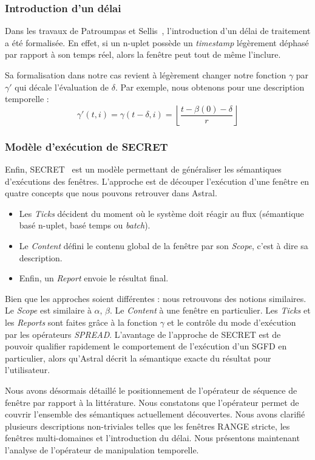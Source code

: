 \subsubsection{Introduction d'un délai}
Dans les travaux de Patroumpas et Sellis~\cite{Patroumpas:window}, l'introduction d'un délai de traitement a été formalisée. En effet, si un n-uplet possède un \textit{timestamp} légèrement déphasé par rapport à son temps réel, alors la fenêtre peut tout de même l'inclure.

Sa formalisation dans notre cas revient à légèrement changer notre fonction $\gamma$ par $\gamma'$ qui décale l'évaluation de $\delta$. Par exemple, nous obtenons pour une description temporelle : $$\gamma'(t,i) = \gamma(t-\delta,i) = \left\lfloor\frac{t-\beta(0)-\delta}{r}\right\rfloor$$

\subsubsection{Modèle d'exécution de SECRET}
Enfin, SECRET~\cite{Botan:secret} est un modèle permettant de généraliser les sémantiques d'exécutions des fenêtres. L'approche est de découper l'exécution d'une fenêtre en quatre concepts que nous pouvons retrouver dans Astral.
\begin{itemize}
	\item Les \textit{Ticks} décident du moment où le système doit réagir au flux (sémantique basé n-uplet, basé temps ou \textit{batch}).
	\item Le \textit{Content} défini le contenu global de la fenêtre par son \textit{Scope}, c'est à dire sa description.
	\item Enfin, un \textit{Report} envoie le résultat final.
\end{itemize}

Bien que les approches soient différentes : nous retrouvons des notions similaires. Le \textit{Scope} est similaire à $\alpha$, $\beta$. Le \textit{Content} à une fenêtre en particulier. Les \textit{Ticks} et les \textit{Reports} sont faites grâce à la fonction $\gamma$ et le contrôle du mode d'exécution par les opérateurs \textit{SPREAD}. L'avantage de l'approche de SECRET est de pouvoir qualifier rapidement le comportement de l'exécution d'un SGFD en particulier, alors qu'Astral décrit la sémantique exacte du résultat pour l'utilisateur.

Nous avons désormais détaillé le positionnement de l'opérateur de séquence de fenêtre par rapport à la littérature. Nous constatons que l'opérateur permet de couvrir l'ensemble des sémantiques actuellement découvertes. Nous avons clarifié plusieurs descriptions non-triviales telles que les fenêtres RANGE stricte, les fenêtres multi-domaines et l'introduction du délai. Nous présentons maintenant l'analyse de l'opérateur de manipulation temporelle.

